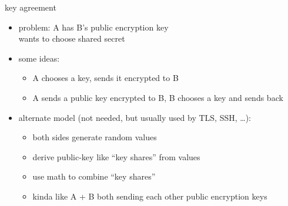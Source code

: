 
\begin{frame}{key agreement}
    \begin{itemize}
    \item problem: A has B's public encryption key \\
        wants to choose shared secret
    \vspace{.5cm}
    \item some ideas:
        \begin{itemize}
        \item A chooses a key, sends it encrypted to B
        \item A sends a public key encrypted to B, B chooses a key and sends back
        \end{itemize}
    \item<2-> alternate model (not needed, but usually used by TLS, SSH, \ldots):
        \begin{itemize}
        \item both sides generate random values
        \item derive public-key like ``key shares'' from values
        \item use math to combine ``key shares''
        \item kinda like A + B both sending each other public encryption keys
        \end{itemize}
    \end{itemize}
\end{frame}


